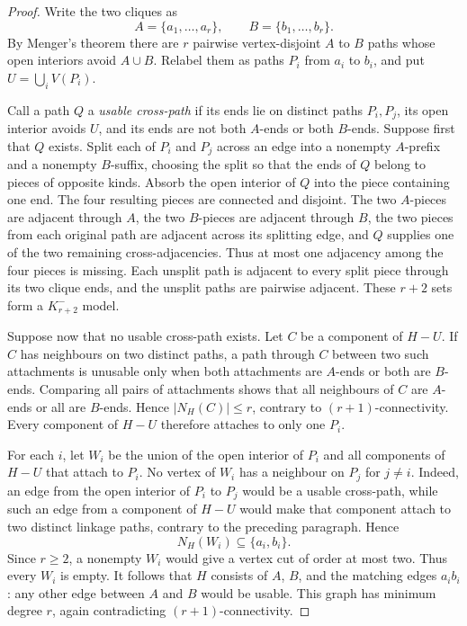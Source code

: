 \documentclass[11pt]{amsart}
\newcommand{\N}{N}
\begin{document}
\begin{proof}
Write the two cliques as
\[
        A=\{a_1,\ldots,a_r\},
        \qquad B=\{b_1,\ldots,b_r\}.
\]
By Menger's theorem there are $r$ pairwise vertex-disjoint $A$ to $B$
paths whose open interiors avoid $A\cup B$.  Relabel them as paths $P_i$
from $a_i$ to $b_i$, and put $U=\bigcup_iV(P_i)$.

Call a path $Q$ a \emph{usable cross-path} if its ends lie on distinct
paths $P_i,P_j$, its open interior avoids $U$, and its ends are not both
$A$-ends or both $B$-ends.  Suppose first that $Q$ exists.  Split each of
$P_i$ and $P_j$ across an edge into a nonempty $A$-prefix and a nonempty
$B$-suffix, choosing the split so that the ends of $Q$ belong to pieces of
opposite kinds.  Absorb the open interior of $Q$ into the piece containing
one end.  The four resulting pieces are connected and disjoint.  The two
$A$-pieces are adjacent through $A$, the two $B$-pieces are adjacent
through $B$, the two pieces from each original path are adjacent across
its splitting edge, and $Q$ supplies one of the two remaining
cross-adjacencies.  Thus at most one adjacency among the four pieces is
missing.  Each unsplit path is adjacent to every split piece through its
two clique ends, and the unsplit paths are pairwise adjacent.  These
$r+2$ sets form a $K_{r+2}^{-}$ model.

Suppose now that no usable cross-path exists.  Let $C$ be a component of
$H-U$.  If $C$ has neighbours on two distinct paths, a path through $C$
between two such attachments is unusable only when both attachments are
$A$-ends or both are $B$-ends.  Comparing all pairs of attachments shows
that all neighbours of $C$ are $A$-ends or all are $B$-ends.  Hence
$|\N_H(C)|\leq r$, contrary to $(r+1)$-connectivity.  Every component of
$H-U$ therefore attaches to only one $P_i$.

For each $i$, let $W_i$ be the union of the open interior of $P_i$ and all
components of $H-U$ that attach to $P_i$.  No vertex of $W_i$ has a
neighbour on $P_j$ for $j\ne i$.  Indeed, an edge from the open interior
of $P_i$ to $P_j$ would be a usable cross-path, while such an edge from a
component of $H-U$ would make that component attach to two distinct
linkage paths, contrary to the preceding paragraph.  Hence
\[
        \N_H(W_i)\subseteq\{a_i,b_i\}.
\]
Since $r\geq2$, a nonempty $W_i$ would give a vertex cut of order at most
two.  Thus every $W_i$ is empty.  It follows that $H$ consists of $A$, $B$,
and the matching edges $a_ib_i$: any other edge between $A$ and $B$ would
be usable.  This graph has minimum degree $r$, again contradicting
$(r+1)$-connectivity.
\end{proof}
\end{document}
